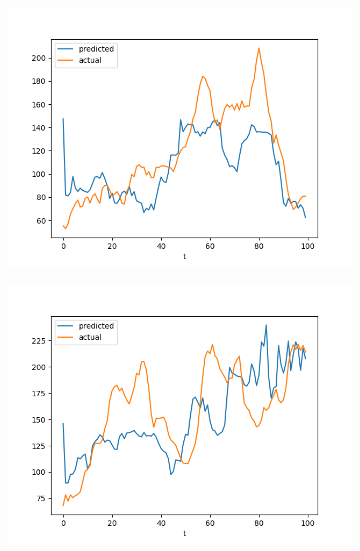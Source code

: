 \documentclass[runningheads]{llncs}
\begin{document}
\begin{figure}
\begin{subfigure}{\figwidth}
            \includegraphics[width=\textwidth]{results/evaluation/c_model_graph_p30.png}
        \end{subfigure}
        \begin{subfigure}{\figwidth}
            \includegraphics[width=\textwidth]{results/evaluation/c_model_graph_p40.png}
        \end{subfigure}
        \begin{subfigure}{\figwidth}

\end{subfigure}
\end{figure}
\end{document}

